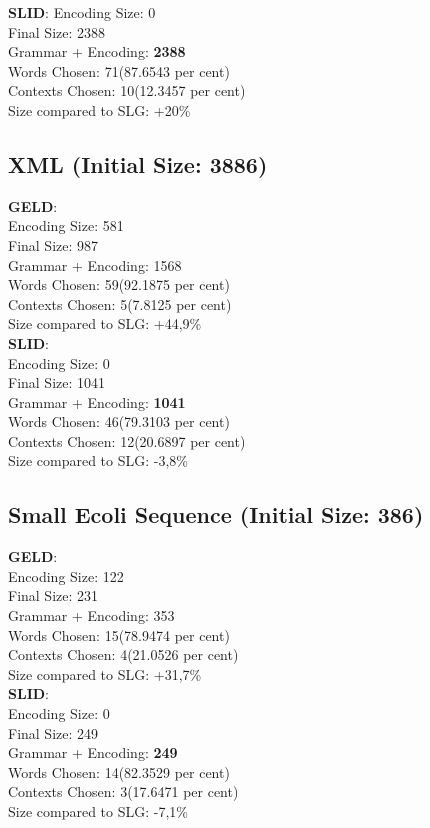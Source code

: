 \textbf{SLID}:
Encoding Size: 0 \\
Final Size: 2388 \\
Grammar + Encoding: \textbf{2388} \\
Words Chosen: 71(87.6543 per cent) \\
Contexts Chosen: 10(12.3457 per cent) \\
Size compared to SLG:  +20\% \\


\subsection{XML (Initial Size: 3886)} 
\textbf{GELD}:\\
Encoding Size: 581 \\
Final Size: 987 \\
Grammar + Encoding: 1568 \\
Words Chosen: 59(92.1875 per cent) \\
Contexts Chosen: 5(7.8125 per cent) \\
Size compared to SLG:  +44,9\% \\

\textbf{SLID}:\\
Encoding Size: 0 \\
Final Size: 1041 \\
Grammar + Encoding: \textbf{1041} \\
Words Chosen: 46(79.3103 per cent) \\
Contexts Chosen: 12(20.6897 per cent) \\
Size compared to SLG:  -3,8\% \\


\subsection{Small Ecoli Sequence (Initial Size: 386)} 
\textbf{GELD}:\\
Encoding Size: 122 \\
Final Size: 231 \\
Grammar + Encoding: 353 \\
Words Chosen: 15(78.9474 per cent) \\
Contexts Chosen: 4(21.0526 per cent) \\
Size compared to SLG:  +31,7\% \\

\textbf{SLID}:\\
Encoding Size: 0 \\
Final Size: 249 \\
Grammar + Encoding: \textbf{249} \\
Words Chosen: 14(82.3529 per cent) \\
Contexts Chosen: 3(17.6471 per cent) \\
Size compared to SLG:  -7,1\% \\






	